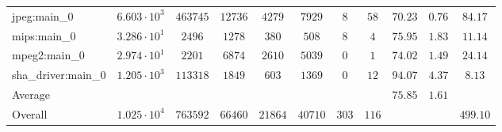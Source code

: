 \begin{tabular}{|l|c|c|c|c|c|c|c|c|c|c|}
jpeg:main\_0            & $ 6.603 \cdot 10^{3} $ & $ 463745 $ & $ 12736 $ & $ 4279  $ & $ 7929  $ & $ 8   $ & $ 58  $ & $ 70.23       $ & $ 0.76    $ & $ 84.17   $ \\
mips:main\_0            & $ 3.286 \cdot 10^{1} $ & $ 2496   $ & $ 1278  $ & $ 380   $ & $ 508   $ & $ 8   $ & $ 4   $ & $ 75.95       $ & $ 1.83    $ & $ 11.14   $ \\
mpeg2:main\_0           & $ 2.974 \cdot 10^{1} $ & $ 2201   $ & $ 6874  $ & $ 2610  $ & $ 5039  $ & $ 0   $ & $ 1   $ & $ 74.02       $ & $ 1.49    $ & $ 24.14   $ \\
sha\_driver:main\_0     & $ 1.205 \cdot 10^{3} $ & $ 113318 $ & $ 1849  $ & $ 603   $ & $ 1369  $ & $ 0   $ & $ 12  $ & $ 94.07       $ & $ 4.37    $ & $ 8.13    $ \\
\hline
Average                 & $                    $ & $        $ & $       $ & $       $ & $       $ & $     $ & $     $ & $ 75.85       $ & $ 1.61    $ & $         $ \\
\hline
Overall                 & $ 1.025 \cdot 10^{4} $ & $ 763592 $ & $ 66460 $ & $ 21864 $ & $ 40710 $ & $ 303 $ & $ 116 $ & $             $ & $         $ & $ 499.10  $ \\
\hline
\end{tabular}
